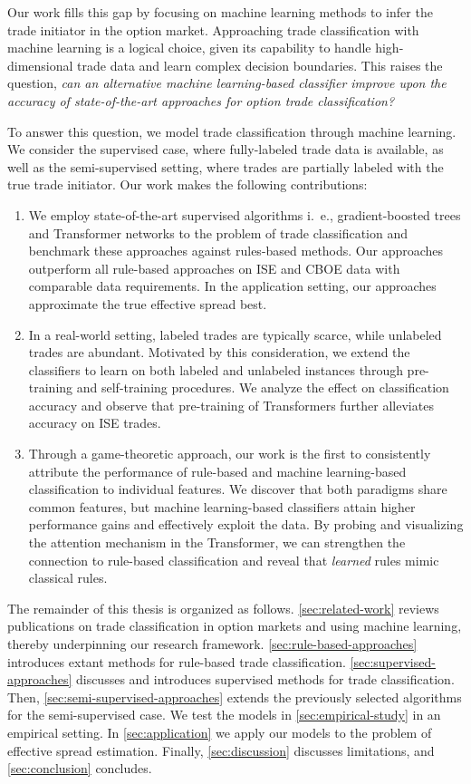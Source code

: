 Our work fills this gap by focusing on machine learning methods to infer the trade initiator in the option market. Approaching trade classification with machine learning is a logical choice, given its capability to handle high-dimensional trade data and learn complex decision boundaries. This raises the question, \emph{can an alternative machine learning-based classifier improve upon the accuracy of state-of-the-art approaches for option trade classification?}

To answer this question, we model trade classification through machine learning. We consider the supervised case, where fully-labeled trade data is available, as well as the semi-supervised setting, where trades are partially labeled with the true trade initiator. Our work makes the following contributions:
\begin{enumerate}[label=(\roman*),noitemsep]
    \item We employ state-of-the-art supervised algorithms i.~e., gradient-boosted trees and Transformer networks to the problem of trade classification and benchmark these approaches against rules-based methods. Our approaches outperform all rule-based approaches on \gls{ISE} and \gls{CBOE} data with comparable data requirements. In the application setting, our approaches approximate the true effective spread best.
    \item In a real-world setting, labeled trades are typically scarce, while unlabeled trades are abundant. Motivated by this consideration, we extend the classifiers to learn on both labeled and unlabeled instances through pre-training and self-training procedures. We analyze the effect on classification accuracy and observe that pre-training of Transformers further alleviates accuracy on \gls{ISE} trades.
    \item Through a game-theoretic approach, our work is the first to consistently attribute the performance of rule-based and machine learning-based classification to individual features. We discover that both paradigms share common features, but machine learning-based classifiers attain higher performance gains and effectively exploit the data. By probing and visualizing the attention mechanism in the Transformer, we can strengthen the connection to rule-based classification and reveal that \emph{learned} rules mimic classical rules.
\end{enumerate}

The remainder of this thesis is organized as follows. \cref{sec:related-work} reviews publications on trade classification in option markets and using machine learning, thereby underpinning our research framework. \cref{sec:rule-based-approaches} introduces extant methods for rule-based trade classification. \cref{sec:supervised-approaches} discusses and introduces supervised methods for trade classification. Then, \cref{sec:semi-supervised-approaches} extends the previously selected algorithms for the semi-supervised case. We test the models in \cref{sec:empirical-study} in an empirical setting. In \cref{sec:application} we apply our models to the problem of effective spread estimation. Finally, \cref{sec:discussion} discusses limitations, and \cref{sec:conclusion} concludes.
